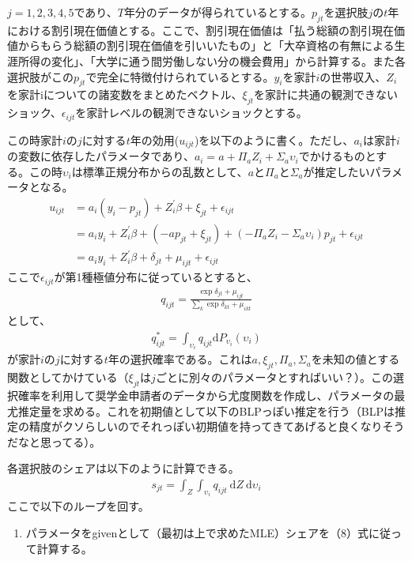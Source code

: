 \documentclass{jsarticle}
\begin{document}
	$j = 1,2,3,4,5$であり、$T$年分のデータが得られているとする。$p_{jt}$を選択肢$j$の$t$年における割引現在価値とする。ここで、割引現在価値は「払う総額の割引現在価値からもらう総額の割引現在価値を引いいたもの」と「大卒資格の有無による生涯所得の変化」、「大学に通う間労働しない分の機会費用」から計算する。また各選択肢がこの$p_{jt}で完全に特徴付けられているとする。$$y_i$を家計$i$の世帯収入、$Z_i$を家計iについての諸変数をまとめたベクトル、$\xi_{jt}$を家計に共通の観測できないショック、$\epsilon_{ijt}$を家計レベルの観測できないショックとする。
	\par
	この時家計$i$の$j$に対する$t$年の効用($u_{ijt}$)を以下のように書く。ただし、$a_i$は家計$i$の変数に依存したパラメータであり、$a_i = a + \Pi_aZ_i + \Sigma_a\upsilon_{i}$でかけるものとする。この時$\upsilon_{i}$は標準正規分布からの乱数として、$a$と$\Pi_a$と$\Sigma_a$が推定したいパラメータとなる。
	\begin{align}
		u_{ijt} &= a_i (y_i - p_{jt}) + Z_i^{'}\beta + \xi_{jt} + \epsilon_{ijt} \nonumber \\
		&= a_i y_i + Z_i^{'}\beta + (-a p_{jt} + \xi_{jt}) + (-\Pi_a Z_i - \Sigma_a \upsilon_i )p_{jt} + \epsilon_{ijt} \nonumber \\
		&= a_i y_i + Z_i^{'}\beta + \delta_{jt} + \mu_{ijt} + \epsilon_{ijt}
	\end{align}
	ここで$\epsilon_{ijt}$が第1種極値分布に従っているとすると、
	\begin{align}
		q_{ijt} = \frac{\exp{\delta_{jt} + \mu_{ijt}}}{\sum_k \exp{\delta_{kt} + \mu_{ikt}}} \nonumber
	\end{align}
	として、
	\begin{align}
		q_{ijt}^{*} = \int_{\upsilon_i} q_{ijt} \mathrm{d} P_{\upsilon_i}(\upsilon_i)
	\end{align}
	が家計$i$の$j$に対する$t$年の選択確率である。これは$a, \xi_{jt}, \Pi_a, \Sigma_a$を未知の値とする関数としてかけている（$\xi_{jt}$は$j$ごとに別々のパラメータとすればいい？）。この選択確率を利用して奨学金申請者のデータから尤度関数を作成し、パラメータの最尤推定量を求める。これを初期値として以下のBLPっぽい推定を行う（BLPは推定の精度がクソらしいのでそれっぽい初期値を持ってきてあげると良くなりそうだなと思ってる）。
	\par
	各選択肢のシェアは以下のように計算できる。
	\begin{align}
		s_{jt} = \int_{Z} \int_{\upsilon_i} q_{ijt}\ \mathrm{d}Z\ \mathrm{d}\upsilon_i
	\end{align}
	ここで以下のループを回す。
	\begin{enumerate}
		\item パラメータをgivenとして（最初は上で求めたMLE）シェアを（8）式に従って計算する。

\end{enumerate}$$
\end{document}

